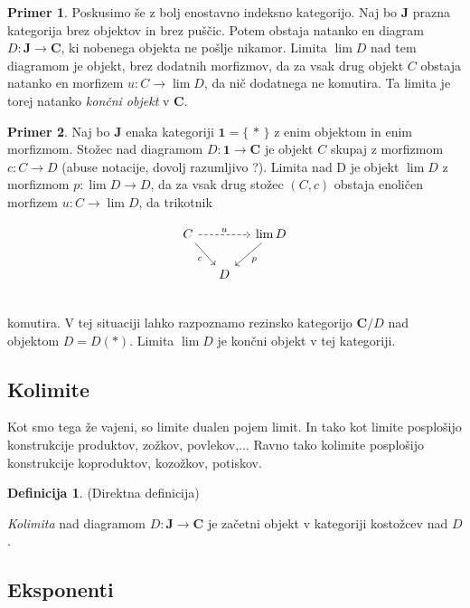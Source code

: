 \documentclass[12pt,a4paper]{book}
\theoremstyle{definition}
\newtheorem{definicija}{Definicija}[chapter]
\theoremstyle{plain}
\theoremstyle{definition}
\newtheorem{primer}{Primer}[section]
\theoremstyle{remark}
\newcommand{\cat}[1]{\textbf{#1}}
\renewcommand{\set}[1]{\{\,#1\,\}}
\begin{document}
\begin{primer}
Poskusimo še z bolj enostavno indeksno kategorijo. Naj bo $\cat{J}$ prazna kategorija brez objektov in brez puščic. Potem obstaja natanko en diagram $D : \cat{J} \to \cat{C}$, ki nobenega objekta ne pošlje nikamor. Limita $\lim D$ nad tem diagramom je objekt, brez dodatnih morfizmov, da za vsak drug objekt $C$ obstaja natanko en morfizem $u : C \to \lim D$, da nič dodatnega ne komutira. Ta limita je torej natanko \textit{končni objekt} v $\cat{C}$.
\end{primer}

\begin{primer}
Naj bo $\cat{J}$ enaka kategoriji $\cat{1} = \set{\ast}$ z enim objektom in enim morfizmom. Stožec nad diagramom $D : \cat{1} \to \cat{C}$ je objekt $C$ skupaj z morfizmom $c : C \to D$ (abuse notacije, dovolj razumljivo ?). Limita nad D je objekt $\lim D$ z morfizmom $p : \lim D \to D$, da za vsak drug stožec $(C, c)$ obstaja enoličen morfizem $u : C \to \lim D$, da trikotnik

$$\begin{tikzcd}[column sep=small]
C \ar[dr, "c"'] \ar[rr, dashed, "u"] & & \lim D \ar[dl, "p"] \\
& D & \\
\end{tikzcd}$$
komutira. V tej situaciji lahko razpoznamo rezinsko kategorijo $\cat{C}/D$ nad objektom $D = D(\ast)$. Limita $\lim D$ je končni objekt v tej kategoriji.
\end{primer}



\subsection{Kolimite}
Kot smo tega že vajeni, so limite dualen pojem limit. In tako kot limite posplošijo konstrukcije produktov, zožkov, povlekov,... Ravno tako kolimite posplošijo konstrukcije koproduktov, kozožkov, potiskov.

\begin{definicija} (Direktna definicija)

\emph{Kolimita} nad diagramom $D : \cat{J} \to \cat{C}$ je začetni objekt v kategoriji kostožcev nad $D$.
\end{definicija}

\subsection{Eksponenti}
\end{document}
